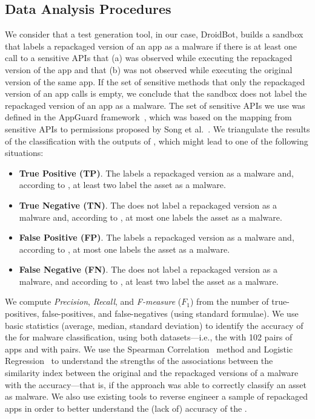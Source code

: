 \subsection{Data Analysis Procedures} \label{sec:dataAnalysisProc}



We consider that a test
generation tool, in our case, DroidBot, builds a sandbox that labels a repackaged version
of an app as a malware if there is at least one call to a sensitive APIs that (a) was observed
while executing the repackaged version of the app and that (b) was not observed while
executing the original version of the same app. If the set of sensitive methods that only the repackaged version of an app calls is empty,
we conclude that the sandbox does not label the repackaged version of an app as a malware. The set of sensitive APIs we use was defined in the AppGuard framework~\cite{DBLP:conf/esorics/BackesGHMS13}, which was based on the mapping from sensitive APIs to permissions proposed by Song et al.~\cite{DBLP:conf/ccs/FeltCHSW11}. We triangulate
the results of the \mas classification with the outputs of \vt, which might lead to one of the following
situations:

\begin{itemize}
\item {\bf True Positive (TP)}. The \mas labels a repackaged version as a malware and, according to
  \vt, at least two \ses label the asset as a malware.
  
\item {\bf True Negative (TN)}. The \mas does not label a repackaged version as a malware and,
  according to \vt, at most one \se labels the asset as a malware. 

\item {\bf False Positive (FP)}. The \mas labels a repackaged version as a malware and, according to
  \vt, at most one \se labels the asset as a malware.

\item {\bf False Negative (FN)}. The \mas does not label a repackaged version as a malware, and
  according to \vt, at least two \ses label the asset as a malware.
\end{itemize}

We compute \emph{Precision}, \emph{Recall}, and \emph{F-measure} ($F_1$) from
the number of true-positives, false-positives, and false-negatives (using standard
formulae). We use basic statistics (average, median, standard deviation) to identify the
accuracy of the \mas for malware classification, using both datasets---i.e., the \sds
with 102 pairs of apps and \cds with
\apps pairs. We use the Spearman Correlation~\cite{spearman-correlation} method and
Logistic Regression~\cite{statistical-learning} to understand the strengths of
the associations between the similarity index between the original and the repackaged versions
of a malware with the \mas accuracy---that is,
if the approach was able to correctly classify an asset as malware. We also use existing tools to reverse engineer a sample of repackaged
apps in order to better understand the (lack of) accuracy
of the \mas.

